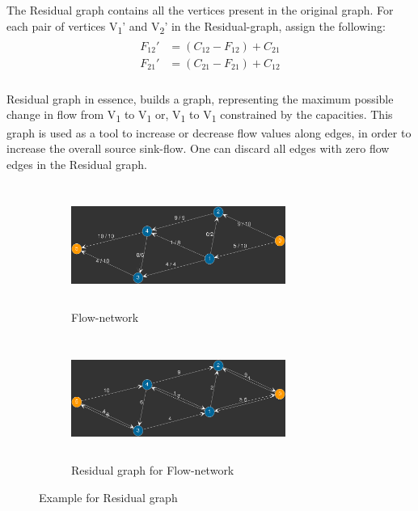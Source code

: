 \documentclass[paper=a4, fontsize=11pt]{scrartcl} %
\numberwithin{equation}{section} %
\numberwithin{figure}{section} %
\numberwithin{table}{section} %
\begin{document}
The Residual graph contains all the vertices present in the original graph. For each pair of vertices V\textsubscript{1}' and V\textsubscript{2}' in the Residual-graph, assign the following:
\begin{align}
\begin{split}
F_{12}' &= (C_{12} - F_{12} ) + C_{21}\\
F_{21}' &= (C_{21} - F_{21} ) + C_{12}\\
\end{split}
\end{align}

Residual graph in essence, builds a graph, representing the maximum possible change in flow from V\textsubscript{1} to V\textsubscript{1} or, V\textsubscript{1} to V\textsubscript{1} constrained by the capacities. This graph is used as a tool to increase or decrease flow values along edges, in order to increase the overall source sink-flow. One can discard all edges with zero flow edges in the Residual graph.

\begin{figure}[h]
\begin{subfigure}{0.5\textwidth}
\includegraphics[width=7cm, height=4cm,center]{p6.png}
\caption{Flow-network}
\label{fig:subim1}
\end{subfigure}
\begin{subfigure}{0.5\textwidth}
\includegraphics[width=7cm, height=4cm,center]{p5.png}
\caption{Residual graph for Flow-network}
\label{fig:subim2}
\end{subfigure}

\caption{Example for Residual graph}
\label{fig:image2}
\end{figure}
\end{document}
